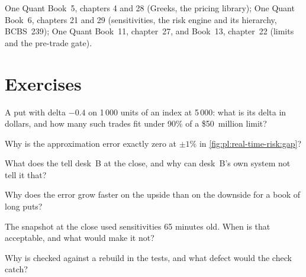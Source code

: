\begin{omsources}
\item One Quant Book~5, chapters 4 and 28 (Greeks, the pricing library); One Quant Book~6, chapters 21 and 29 (sensitivities, the risk
engine and its hierarchy, BCBS~239); One Quant Book~11, chapter~27, and Book~13, chapter~22 (limits and the pre-trade gate).
\end{omsources}

\section{Exercises}

\begin{exercise}[$\star$]\label{exo:pl:real-time-risk:1}
A put with delta $-0.4$ on 1\,000 units of an index at 5\,000: what is its delta in dollars, and how many such trades fit under 90\% of a
\$50~million limit?
\end{exercise}

\begin{exercise}[$\star$]\label{exo:pl:real-time-risk:2}
Why is the approximation error exactly zero at $\pm 1\%$ in \cref{fig:pl:real-time-risk:gap}?
\end{exercise}

\begin{exercise}[$\star$]\label{exo:pl:real-time-risk:3}
What does the  tell desk~B at the close, and why can desk~B's own system not tell it that?
\end{exercise}

\begin{exercise}[$\star\star$]\label{exo:pl:real-time-risk:4}
Why does the error grow faster on the upside than on the downside for a book of long puts?
\end{exercise}

\begin{exercise}[$\star\star$]\label{exo:pl:real-time-risk:5}
The snapshot at the close used sensitivities 65 minutes old. When is that acceptable, and what would make it not?
\end{exercise}

\begin{exercise}[$\star\star$]\label{exo:pl:real-time-risk:6}
Why is  checked against a rebuild in the tests, and what defect would the check catch?
\end{exercise}

